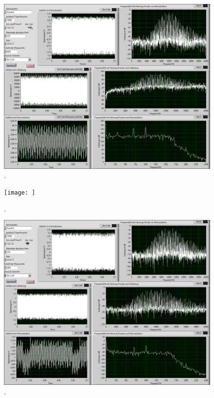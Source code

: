 \documentclass[
a4paper,
12pt,
pagesize,
ngerman
]{scrartcl}
\begin{document}
	\begin{figure}[H]
		\centering
		\includegraphics[width=1.0\textwidth]{EIRE2018Dateien/Tag4/OsziFMPM-Demod/FM/OsziPlusFMPMp}
		\caption{.}
	\end{figure}
\iffalse
	\begin{figure}[H] %
		\centering
		\texttt{[image: ]}
		\caption{.}
	\end{figure}

	\begin{figure}[H]
		\centering
		\includegraphics[width=1.0\textwidth]{EIRE2018Dateien/Tag4/OsziFMPM-Demod/PM/OsziPlusFMPMp}
		\caption{.}
	\end{figure}
\end{document}
